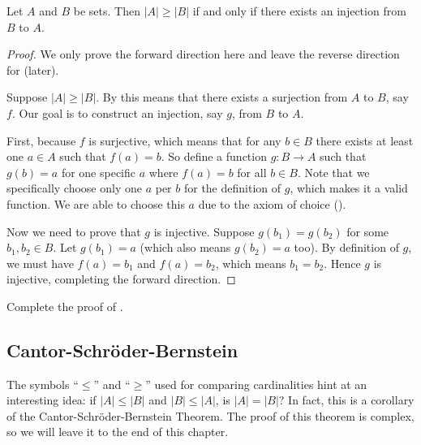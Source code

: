 \begin{theorem}\label{theorem:agreement-of-cardinality-definitions}
    Let $A$ and $B$ be sets. Then $|A| \geq |B|$ if and only if there exists an injection from $B$ to $A$.
\end{theorem}
\begin{proof}
    We only prove the forward direction here and leave the reverse direction for  (later).

    Suppose $|A| \geq |B|$. By  this means that there exists a surjection from $A$ to $B$, say $f$. Our goal is to construct an injection, say $g$, from $B$ to $A$. 
    
    First, because $f$ is surjective, which means that for any $b \in B$ there exists at least one $a \in A$ such that $f(a) = b$. So define a function $g: B \to A$ such that $g(b) = a$ for one specific $a$ where $f(a) = b$ for all $b \in B$. Note that we specifically choose only one $a$ per $b$ for the definition of $g$, which makes it a valid function. We are able to choose this $a$ due to the axiom of choice ().

    Now we need to prove that $g$ is injective. Suppose $g(b_1) = g(b_2)$ for some $b_1, b_2 \in B$. Let $g(b_1) = a$ (which also means $g(b_2) = a$ too). By definition of $g$, we must have $f(a) = b_1$ and $f(a) = b_2$, which means $b_1 = b_2$. Hence $g$ is injective, completing the forward direction.
\end{proof}

\begin{exercise}\label{exercise:agreement-of-cardinality-definitions}
    Complete the proof of .
\end{exercise}

\subsection{Cantor-Schr\"oder-Bernstein}
The symbols ``$\leq$'' and ``$\geq$'' used for comparing cardinalities hint at an interesting idea: if $|A| \leq |B|$ and $|B| \leq |A|$, is $|A| = |B|$? In fact, this is a corollary of the Cantor-Schr\"oder-Bernstein Theorem. The proof of this theorem is complex, so we will leave it to the end of this chapter.

